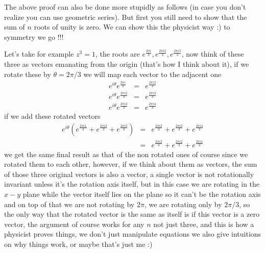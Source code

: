 \documentclass[aps,preprint,preprintnumbers,nofootinbib,showpacs,prd]{revtex4-1}
\newcommand{\nbea}{\begin{eqnarray*}}
\newcommand{\neea}{\end{eqnarray*}}
\begin{document}
The above proof can also be done more stupidly as follows (in case you don't realize you can use geometric series). But first you still need to show that the sum of $n$ roots of unity is zero. We can show this the physicist way :) to symmetry we go !!!

Let's take for example $z^3 = 1$, the roots are $e^{\frac{2\pi i}{3}}, e^{\frac{2\pi i 2}{3}}, e^{\frac{2\pi i 3}{3}}$, now think of these three as vectors emanating from the origin (that's how I think about it), if we rotate these by $\theta = 2\pi / 3$ we will map each vector to the adjacent one
%
\nbea
e^{i\theta}e^{\frac{2\pi i}{3}} & = & e^{\frac{2\pi i 2}{3}} \\
e^{i\theta}e^{\frac{2\pi i 2}{3}} & = & e^{\frac{2\pi i 3}{3}} \\
e^{i\theta}e^{\frac{2\pi i 3}{3}} & = & e^{\frac{2\pi i 4}{3}}
\neea
%
if we add these rotated vectors
%
\nbea
e^{i\theta} \left ( e^{\frac{2\pi i 1}{3}} + e^{\frac{2\pi i 2}{3}} + e^{\frac{2\pi i 3}{3}} \right ) & = & e^{\frac{2\pi i 2}{3}} + e^{\frac{2\pi i 3}{3}} + e^{\frac{2\pi i 4}{3}} \\
&= & e^{\frac{2\pi i 2}{3}} + e^{\frac{2\pi i 2}{3}} + e^{\frac{2\pi i 1}{3}}
\neea
%
we get the same final result as that of the non rotated ones of course since we rotated them to each other, however, if we think about them as vectors, the sum of those three original vectors is also a vector, a single vector is not rotationally invariant unless it's the rotation axis itself, but in this case we are rotating in the $x-y$ plane while the vector itself lies on the plane so it can't be the rotation axis and on top of that we are not rotating by $2\pi$, we are rotating only by $2\pi/3$, so the only way that the rotated vector is the same as itself is if this vector is a zero vector, the argument of course works for any $n$ not just three, and this is how a physicist proves things, we don't just manipulate equations we also give intuitions on why things work, or maybe that's just me :)
\end{document}
